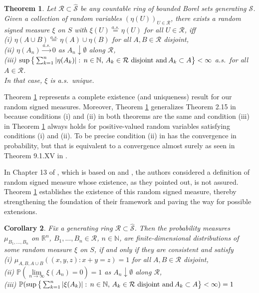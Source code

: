 \documentclass{article}
\theoremstyle{plain}
\newtheorem{theorem}{Theorem}[section]
\newtheorem{corollary}[theorem]{Corollary}
\theoremstyle{remark}
\begin{document}
\begin{theorem}\label{thm-extension}
	Let $\mathcal{R}\subset\hat{\mathcal{S}}$ be any countable ring of bounded Borel sets generating $\mathcal{S}$. Given a collection of random variables $(\eta(U))_{U\in\mathcal{R}}$, there exists a random signed measure $\xi$ on $S$ with $\xi(U) \stackrel{a.s.}{=} \eta(U)$ for all $U\in\mathcal{R}$, iff
	\\ \textnormal{(i)}  $\eta(A\cup B)\stackrel{a.s.}{=}\eta(A)\cup\eta(B)$ for all $A,B\in \mathcal{R}$ disjoint,
	\\ \textnormal{(ii)} $\eta(A_n)\stackrel{a.s.}{\to}0$ as $A_n\downarrow\emptyset$ along $\mathcal{R}$,
	\\ \textnormal{(iii)} $\sup\big\{\sum_{k=1}^{n}|\eta(A_k)|:\, \textnormal{$n\in\mathbb{N}$, $A_k\in\mathcal{R}$ disjoint and\,$A_k\subset A$} \big\}<\infty$ a.s.~for all $A\in\mathcal{R}$.
	\\ In that case, $\xi$ is a.s.~unique.
\end{theorem}
Theorem \ref{thm-extension} represents a complete existence (and uniqueness) result for our random signed measures. Moreover, Theorem \ref{thm-extension} generalizes Theorem 2.15 in \citet{Kallenberg2} because conditions (i) and (ii) in both theorems are the same and condition (iii) in Theorem \ref{thm-extension} always holds for positive-valued random variables satisfying conditions (i) and (ii). To be precise condition (ii) in \citet{Kallenberg2} has the convergence in probability, but that is equivalent to a convergence almost surely as seen in Theorem 9.1.XV in \citet{Daley}.


In Chapter 13 of \citet{cohen}, which is based on \citet{Jacodbook1979} and \citet{JacShir03}, the authors considered a definition of random signed measure whose existence, as they pointed out, is not assured. Theorem \ref{thm-extension} establishes the existence of this random signed measure, thereby strengthening the foundation of their framework and paving the way for possible extensions.

\begin{corollary}\label{co-extension}
	Fix a generating ring $\mathcal{R}\subset\hat{\mathcal{S}}$. Then the probability measures $\mu_{B_1,...,B_n}$ on $\mathbb{R}^n$, $B_1, . . . , B_n \in\mathcal{R}$,  $n\in\mathbb{N}$, are finite-dimensional distributions of some random measure $\xi$ on $S$, if and only if they are consistent and satisfy
	\\ \textnormal{(i)}  $\mu_{A,B,A\cup B}((x,y,z):x+y=z)=1$ for all $A,B\in \mathcal{R}$ disjoint,
	\\ \textnormal{(ii)} $\mathbb{P}(\lim\limits_{n\to\infty}\xi(A_n)=0)=1$ as $A_n\downarrow\emptyset$ along $\mathcal{R}$,
	\\ \textnormal{(iii)} $\mathbb{P}(\sup\big\{\sum_{k=1}^{n}|\xi(A_k)|:\, \textnormal{$n\in\mathbb{N}$, $A_k\in\mathcal{R}$ disjoint and\,$A_k\subset A$} \big\}<\infty)=1$
\end{corollary}
\end{document}
